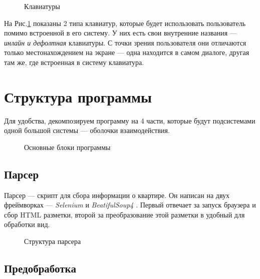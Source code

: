 \documentclass{article}
\begin{document}
		\begin{figure}[H]
			\centering
			\hfill %
			\caption{Клавиатуры}
			\label{fig:keyboard}
		\end{figure}
		
		На Рис.\ref{fig:keyboard} показаны 2 типа клавиатур, которые будет использовать пользователь помимо встроенной в его систему. У них есть свои внутренние названия --- \textit{инлайн и дефолтная} клавиатуры. С точки зрения пользователя они отличаются только местонахождением на экране --- одна находится в самом диалоге, другая там же, где встроенная в систему клавиатура.
		

	\newpage
	\section {Структура программы}
	
		Для удобства, декомпозируем программу на 4 части, которые будут подсистемами одной большой системы --- оболочки взаимодействия.
		
		\begin{figure}[H]
			\centering
			\caption{Основные блоки программы}
			\label{fig:all_modules}
		\end{figure}
	
		\subsection{Парсер}
		
			Парсер --- скрипт для сбора информации о квартире. Он написан на двух фреймворках --- \textit{Selenium} \cite{litlink8} и \textit{BeatifulSoup4} \cite{litlink9}. Первый отвечает за запуск браузера и сбор HTML разметки, второй за преобразование этой разметки в удобный для обработки вид.
			
			\begin{figure}[H]
				\centering
				\caption{Структура парсера}
				\label{fig:parser}
			\end{figure}
		
		\newpage
		\subsection{Предобработка}
		
\end{document}
